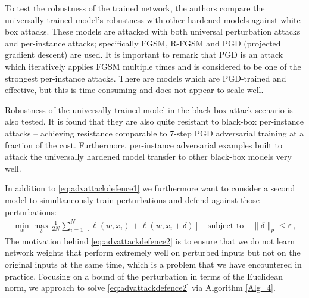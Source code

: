 To test the robustness of the trained network, the authors compare the universally trained model's robustness with other hardened models against white-box attacks. These models are attacked with both universal perturbation attacks and per-instance attacks; specifically FGSM, R-FGSM and PGD (projected gradient descent) are used. It is important to remark that PGD is an attack which iteratively applies FGSM multiple times and is considered to be one of the strongest per-instance attacks. There are models which are PGD-trained and effective, but this is time consuming and does not appear to scale well. %


Robustness of the universally trained model in the black-box attack scenario is also tested. It is found that they are also quite resistant to black-box per-instance attacks – achieving resistance comparable to 7-step PGD adversarial training at a fraction of the cost. Furthermore, per-instance adversarial examples built to attack the universally hardened model transfer to other black-box models very well.

In addition to \eqref{eq:advattackdefence1} we furthermore want to consider a second model to simultaneously train perturbations and defend against those perturbations:
\begin{align}
    \min_w \max_{\delta} \frac{1}{2N} \sum_{i = 1}^N \left[ \ell(w, x_i) + \ell(w, x_i + \delta) \right] \quad \text{subject to} \quad \| \delta \|_p \leq \varepsilon \, , \label{eq:advattackdefence2}
\end{align}
The motivation behind \eqref{eq:advattackdefence2} is to ensure that we do not learn network weights that perform extremely well on perturbed inputs but not on the original inputs at the same time, which is a problem that we have encountered in practice. Focusing on a bound of the perturbation in terms of the Euclidean norm, we approach to solve \eqref{eq:advattackdefence2} via Algorithm \ref{Alg_4}.

